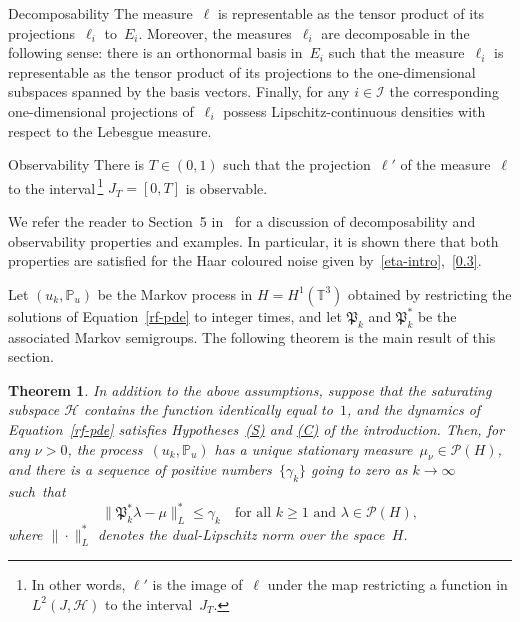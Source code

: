 \documentclass[11pt]{article}
\theoremstyle{plain}
\newtheorem{theorem}{Theorem}[section]
\theoremstyle{definition}
\newtheorem*{namedassumption}{\jepassumptionname}
\newenvironment{enonce*}[1]{\def\jepassumptionname{#1}\begin{namedassumption}}{\end{namedassumption}}
\let\mathcal\mathscr
\theoremstyle{plain}
\numberwithin{equation}{section}
\newcommand{\IP}{{\mathbb P}}
\newcommand{\T}{{\mathbb T}}
\newcommand{\HH}{{\mathcal H}}
\newcommand{\II}{{\mathcal I}}
\newcommand{\PP}{{\mathcal P}}
\newcommand{\PPPP}{{\mathfrak P}}
\begin{document}
\begin{enonce*}{Decomposability}
The measure~$\ell$ is representable as the tensor product of its projections~$\ell_i$ to~$E_i$. Moreover, the measures~$\ell_i$ are decomposable in the following sense: there is an orthonormal basis in~$E_i$ such that the measure~$\ell_i$ is representable as the tensor product of its projections to the one-dimensional subspaces spanned by the basis vectors. Finally, for any $i\in\II$ the corresponding one-dimensional projections of~$\ell_i$ possess Lipschitz-continuous densities with respect to the Lebesgue measure.
\end{enonce*}
\begin{enonce*}{Observability}
There is $T\in(0,1)$ such that the projection~$\ell'$ of the measure~$\ell$ to the interval\,\footnote{In other words, $\ell'$ is the image of~$\ell$ under the map restricting a function in $L^2(J,\HH)$ to the interval~$J_T$.} $J_T=[0,T]$ is observable.
\end{enonce*}

We refer the reader to Section~5 in~\cite{KNS-2020} for a discussion of decomposability and observability properties and examples. In particular, it is shown there that both properties are satisfied for the Haar coloured noise given by~\eqref{eta-intro},~\eqref{0.3}.

Let $(u_k, \IP_u)$ be the Markov process in $H=H^1(\T^3)$ obtained by restricting the solutions of Equation~\eqref{rf-pde} to integer times, and let $\PPPP_k$ and $\PPPP_k^*$ be the associated Markov semigroups. The following theorem is the main result of this section.

\begin{theorem} \label{T:4.3}
In addition to the above assumptions, suppose that the saturating subspace $\HH$ contains the function identically equal to~$1$, and the dynamics of Equation~\eqref{rf-pde} satisfies Hypotheses~\hyperlink{S}{\rm(S)} and \hyperlink{C}{\rm(C)} of the introduction. Then, for any $\nu>0$, the process~$(u_k,\IP_u)$ has a unique stationary measure~$\mu_\nu\in\PP(H)$,
and there is a sequence of positive numbers~$\{\gamma_k\}$ going to zero as $k\to\infty$ such~that
\begin{equation} \label{uniform-convergence}
\|\PPPP_k^*\lambda-\mu\|_L^*\le \gamma_k\quad\text{for all $k\ge1$ and $\lambda\in\PP(H)$},
\end{equation}
where $\|\cdot\|_L^*$ denotes the dual-Lipschitz norm over the space~$H$.
\end{theorem}
\end{document}
